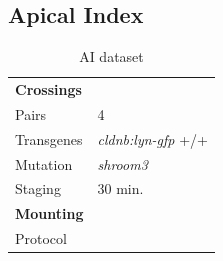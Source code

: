 \documentclass[11pt,singlespacinge,twoside]{reedthesis} %
\begin{document}
\hypertarget{aci-data}{%
\subsection{Apical Index}\label{aci-data}}
\begin{longtable}[]{@{}ll@{}}
\caption{\label{tab:acidata} AI dataset}\tabularnewline
\toprule
\endhead
\begin{minipage}[t]{0.21\columnwidth}\raggedright
\textbf{Crossings}\strut
\end{minipage} & \begin{minipage}[t]{0.73\columnwidth}\raggedright
\strut
\end{minipage}\tabularnewline
\begin{minipage}[t]{0.21\columnwidth}\raggedright
Pairs\strut
\end{minipage} & \begin{minipage}[t]{0.73\columnwidth}\raggedright
4\strut
\end{minipage}\tabularnewline
\begin{minipage}[t]{0.21\columnwidth}\raggedright
Transgenes\strut
\end{minipage} & \begin{minipage}[t]{0.73\columnwidth}\raggedright
\emph{cldnb:lyn-gfp} +/+\strut
\end{minipage}\tabularnewline
\begin{minipage}[t]{0.21\columnwidth}\raggedright
Mutation\strut
\end{minipage} & \begin{minipage}[t]{0.73\columnwidth}\raggedright
\emph{shroom3}\strut
\end{minipage}\tabularnewline
\begin{minipage}[t]{0.21\columnwidth}\raggedright
Staging\strut
\end{minipage} & \begin{minipage}[t]{0.73\columnwidth}\raggedright
30 min.\strut
\end{minipage}\tabularnewline
\begin{minipage}[t]{0.21\columnwidth}\raggedright
\textbf{Mounting}\strut
\end{minipage} & \begin{minipage}[t]{0.73\columnwidth}\raggedright
\strut
\end{minipage}\tabularnewline
\begin{minipage}[t]{0.21\columnwidth}\raggedright
Protocol\strut
\end{minipage} & \begin{minipage}[t]{0.73\columnwidth}\raggedright

\end{minipage}
\end{longtable}
\end{document}
